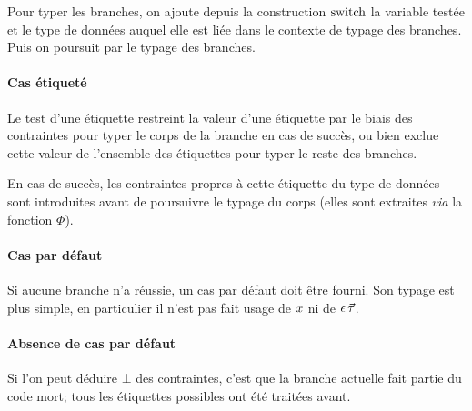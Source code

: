 \begin{mathpar}
%



%
\end{mathpar}
%
Pour typer les branches, on ajoute depuis la construction $\kw{switch}$
la variable testée et le type de données auquel elle est liée dans le contexte
de typage des branches. Puis on poursuit par le typage des branches. 

\paragraph{Cas étiqueté} Le test d'une étiquette restreint la valeur
d'une étiquette par le biais des contraintes pour typer le corps de la branche
en cas de succès, ou bien exclue cette valeur de l'ensemble des étiquettes pour
typer le reste des branches.

En cas de succès, les contraintes propres à cette étiquette du type de données
sont introduites avant de poursuivre le typage du corps (elles sont extraites
\emph{via} la fonction $\Phi$).

\paragraph{Cas par défaut} Si aucune branche n'a réussie, un cas par défaut
doit être fourni. Son typage est plus simple, en particulier il n'est pas fait
usage de $\var$ ni de $\dtype$.

\paragraph{Absence de cas par défaut} Si l'on peut déduire $\bot$ des
contraintes, c'est que la branche actuelle fait partie du code mort; tous les
étiquettes possibles ont été traitées avant.

